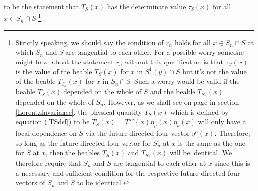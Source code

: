%
to be the statement that  $T_S(x)$ has the determinate value $\tau_S(x)$ for all $x\in S_n\cap S$.\footnote{\label{tangentialnote}Strictly speaking, we should say the condition of $r_n$ holds for all $x\in S_n\cap S$ at which $S_n$ and $S$ are tangential to each other. For a possible worry someone might have about the statement $r_n$ without this qualification is that $\tau_S(x)$ is the value of the beable $T_S(x)$ for $x$ in $S^1(y)\cap S$ but it's not the value of the beable $T_{S_n}(x)$ for $x$ in $S_n\cap S$. Such a worry would be valid if the beable $T_S(x)$ depended on the whole of $S$ and the beable $T_{S_n}(x)$ depended on the whole of $S_n$. However, as we shall see on page \pageref{localdependenceS} in section \ref{LorentzInvariance}, the physical quantity $T_S(x)$ which is defined by equation (\ref{TSdef}) to be $T_S(x)=T^{\mu\nu}(x)\eta_{\mu}(x)\eta_{\nu}(x)$ will only have a local dependence on $S$ via the future directed four-vector $\eta^\mu(x)$. Therefore, so long as the future directed four-vector for $S_n$ at $x$ is the same as the one for $S$ at $x$, then the beables $T_{S}(x)$ and  $T_{S_n}(x)$ will be identical. We therefore require that $S_n$ and $S$ are tangential to each other at $x$ since this is a necessary and sufficient condition for the respective future directed four-vectors of $S_n$ and $S$ to be identical.
\newline
\newline
}
